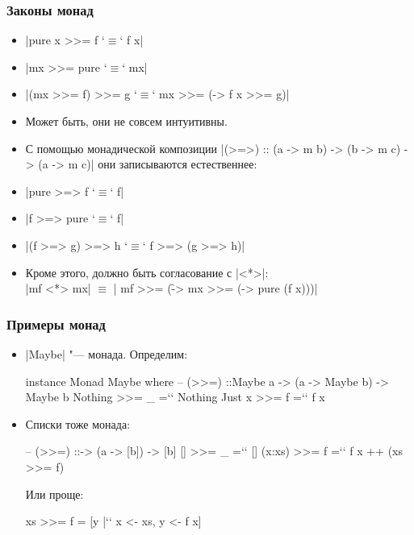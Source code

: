 \documentclass[11pt]{beamer}
\begin{document}
\begin{frame}[fragile]
  \frametitle{Законы монад}
  \begin{itemize}
    \item \haskinline|pure x >>= f `$\equiv$` f x|
    \item \haskinline|mx >>= pure `$\equiv$` mx|
    \item \haskinline[fontsize=\small]|(mx >>= f) >>= g `$\equiv$` mx >>= (\x -> f x >>= g)|
    \item Может быть, они не совсем интуитивны.
          \pause
    \item С помощью монадической композиции \haskinline|(>=>) :: (a -> m b) -> (b -> m c) -> (a -> m c)| они записываются естественнее:
    \item \haskinline|pure >=> f `$\equiv$` f|
    \item \haskinline|f >=> pure `$\equiv$` f|
    \item \haskinline|(f >=> g) >=> h `$\equiv$` f >=> (g >=> h)| \pause
    \item Кроме этого, должно быть согласование с \haskinline|<*>|: \\
          \haskinline|mf <*> mx| $\equiv$ \haskinline|  mf >>= (\f -> mx >>= (\x -> pure (f x)))|
  \end{itemize}
\end{frame}

\begin{frame}[fragile]
  \frametitle{Примеры монад}
  \begin{itemize}[<+->]
    \item \haskinline|Maybe| "--- монада. Определим:
          \begin{haskell}
    instance Monad Maybe where
      -- (>{}>=) ::\pause Maybe a -> (a -> Maybe b) -> Maybe b
      Nothing >>= _ =`\pause` Nothing
      Just x  >>= f =`\pause` f x
    \end{haskell}
    \item Списки тоже монада:
          \begin{haskell}
    -- (>{}>=) ::\pause [a] -> (a -> [b]) -> [b]
    []     >>= _ =`\pause` []
    (x:xs) >>= f =`\pause` f x ++ (xs >>= f)
    \end{haskell}
          Или проще:
          \begin{haskell}
    xs >>= f = [y |`\pause` x <- xs, y <- f x]
    \end{haskell}
  \end{itemize}
\end{frame}
\end{document}
